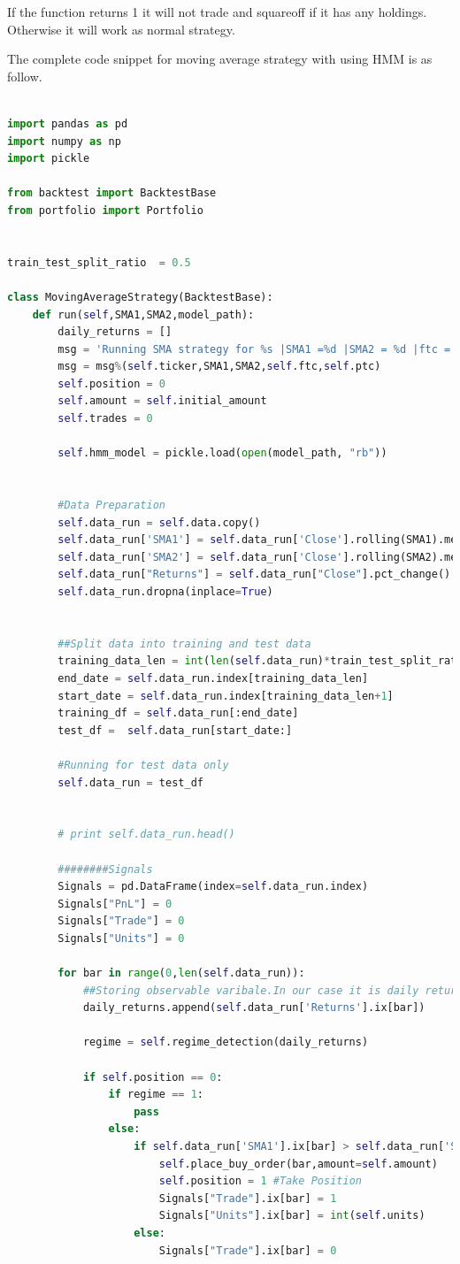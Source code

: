 \documentclass{report}
\begin{document}
If the function returns 1 it will not trade and squareoff if it has any holdings. Otherwise it will work as normal strategy.

The complete code snippet for moving average strategy with using HMM is as follow.

\begin{lstlisting}[language=Python]

import pandas as pd
import numpy as np
import pickle

from backtest import BacktestBase
from portfolio import Portfolio


train_test_split_ratio  = 0.5

class MovingAverageStrategy(BacktestBase):
	def run(self,SMA1,SMA2,model_path):
		daily_returns = []
		msg = 'Running SMA strategy for %s |SMA1 =%d |SMA2 = %d |ftc = %f|ptc = %f'
		msg = msg%(self.ticker,SMA1,SMA2,self.ftc,self.ptc)
		self.position = 0
		self.amount = self.initial_amount
		self.trades = 0

		self.hmm_model = pickle.load(open(model_path, "rb"))


		#Data Preparation
		self.data_run = self.data.copy()
		self.data_run['SMA1'] = self.data_run['Close'].rolling(SMA1).mean()
		self.data_run['SMA2'] = self.data_run['Close'].rolling(SMA2).mean()
		self.data_run["Returns"] = self.data_run["Close"].pct_change() 
		self.data_run.dropna(inplace=True)


		##Split data into training and test data
		training_data_len = int(len(self.data_run)*train_test_split_ratio) ##TO get training data
		end_date = self.data_run.index[training_data_len]
		start_date = self.data_run.index[training_data_len+1]
		training_df = self.data_run[:end_date]
		test_df =  self.data_run[start_date:]

		#Running for test data only
		self.data_run = test_df
		

		# print self.data_run.head()

		########Signals
		Signals = pd.DataFrame(index=self.data_run.index)
		Signals["PnL"] = 0
		Signals["Trade"] = 0
		Signals["Units"] = 0
				
		for bar in range(0,len(self.data_run)):
			##Storing observable varibale.In our case it is daily returns.
			daily_returns.append(self.data_run['Returns'].ix[bar])

			regime = self.regime_detection(daily_returns)

			if self.position == 0:
				if regime == 1:
					pass
				else:
					if self.data_run['SMA1'].ix[bar] > self.data_run['SMA2'].ix[bar]:
						self.place_buy_order(bar,amount=self.amount) 
						self.position = 1 #Take Position
						Signals["Trade"].ix[bar] = 1
						Signals["Units"].ix[bar] = int(self.units)
					else:
						Signals["Trade"].ix[bar] = 0
					

\end{lstlisting}
\end{document}
